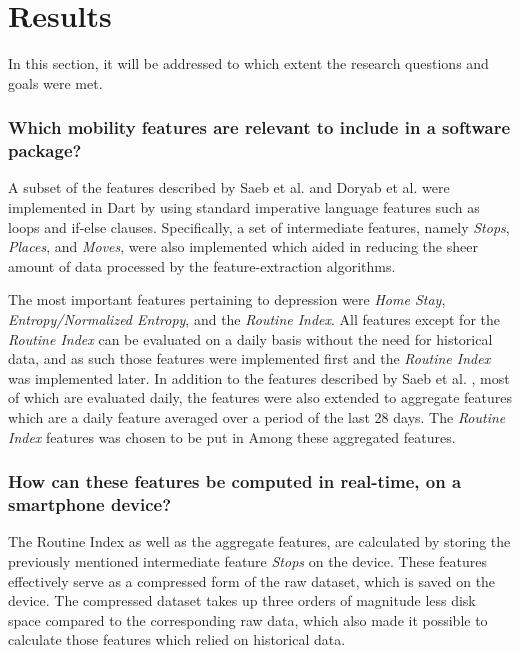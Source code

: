 \section{Results}

In this section, it will be addressed to which extent the research questions and goals were met.

\subsubsection*{Which mobility features are relevant to include in a software package?}
A subset of the features described by Saeb et al.  \cite{Saeb2015} and Doryab et al. \cite{extraction-of-behavioural-features} were implemented in Dart by using standard imperative language features such as loops and if-else clauses. Specifically, a set of intermediate features, namely\textit{ Stops}, \textit{Places}, and \textit{Moves}, were also implemented which aided in reducing the sheer amount of data processed by the feature-extraction algorithms.

The most important features pertaining to depression were \textit{Home Stay}, \textit{Entropy/Normalized Entropy}, and the \textit{Routine Index}. All features except for the \textit{Routine Index} can be evaluated on a daily basis without the need for historical data, and as such those features were implemented first and the \textit{Routine Index} was implemented later. In addition to the features described by Saeb et al. \cite{Saeb2015}, most of which are evaluated daily, the features were also extended to aggregate features which are a daily feature averaged over a period of the last 28 days. The \textit{Routine Index} features was chosen to be put in Among these aggregated features.

\subsubsection*{How can these features be computed in real-time, on a smartphone device?}
The Routine Index as well as the aggregate features, are calculated by storing the previously mentioned intermediate feature \textit{Stops} on the device. These features effectively serve as a compressed form of the raw dataset, which is saved on the device. The compressed dataset takes up three orders of magnitude less disk space compared to the corresponding raw data, which also made it possible to calculate those features which relied on historical data.

